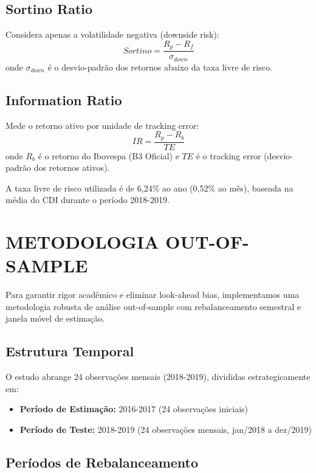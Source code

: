 \subsection{Sortino Ratio}
Considera apenas a volatilidade negativa (downside risk):
\begin{equation}
Sortino = \frac{R_p - R_f}{\sigma_{down}}
\end{equation}
onde $\sigma_{down}$ é o desvio-padrão dos retornos abaixo da taxa livre de risco.

\subsection{Information Ratio}
Mede o retorno ativo por unidade de tracking error:
\begin{equation}
IR = \frac{R_p - R_b}{TE}
\end{equation}
onde $R_b$ é o retorno do Ibovespa (B3 Oficial) e $TE$ é o tracking error (desvio-padrão dos retornos ativos).

A taxa livre de risco utilizada é de 6,24\% ao ano (0,52\% ao mês), baseada na média do CDI durante o período 2018-2019.

\section{METODOLOGIA OUT-OF-SAMPLE}

Para garantir rigor acadêmico e eliminar look-ahead bias, implementamos uma metodologia robusta de análise out-of-sample com rebalanceamento semestral e janela móvel de estimação.

\subsection{Estrutura Temporal}

O estudo abrange 24 observações mensais (2018-2019), divididas estrategicamente em:
\begin{itemize}
    \item \textbf{Período de Estimação:} 2016-2017 (24 observações iniciais)
    \item \textbf{Período de Teste:} 2018-2019 (24 observações mensais, jan/2018 a dez/2019)
\end{itemize}

\subsection{Períodos de Rebalanceamento}

